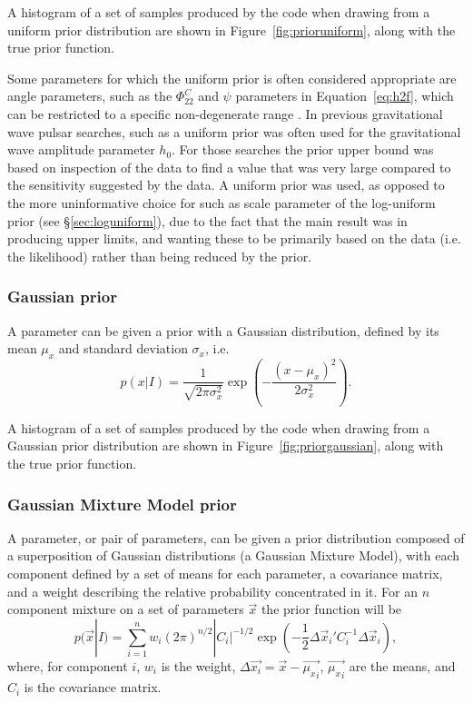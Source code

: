 A histogram of a set of samples produced by the code when drawing from a uniform prior distribution are shown in Figure~\ref{fig:prioruniform},
along with the true prior function.

Some parameters for which the uniform prior is often considered appropriate are angle parameters, such as the $\Phi_{22}^C$ and $\psi$
parameters in Equation~\ref{eq:h2f}, which can be restricted to a specific non-degenerate range \citep[see, e.g., Table~1 in][]{2015MNRAS.453.4399P}. 
In previous gravitational wave pulsar searches, such as \citet{2010ApJ...713..671A,2014ApJ...785..119A} a uniform prior was often used for
the gravitational wave amplitude parameter $h_0$. For those searches the prior upper bound was based on inspection of the data to find a
value that was very large compared to the sensitivity suggested by the data. A uniform prior was used, as opposed to the more
uninformative choice for such as scale parameter of the log-uniform prior (see \S\ref{sec:loguniform}), due to the fact that the main
result was in producing upper limits, and wanting these to be primarily based on the data (i.e. the likelihood) rather than being reduced
by the prior.

\subsubsection{Gaussian prior}

A parameter can be given a prior with a Gaussian distribution, defined by its mean $\mu_x$ and standard deviation $\sigma_x$, i.e.
\begin{equation}
 p(x|I) = \frac{1}{\sqrt{2\pi\sigma_x^2}}\exp{\left(-\frac{(x-\mu_x)^2}{2\sigma_x^2}\right)}.
\end{equation}

A histogram of a set of samples produced by the code when drawing from a Gaussian prior distribution are shown in Figure~\ref{fig:priorgaussian},
along with the true prior function.

\subsubsection{Gaussian Mixture Model prior}

A parameter, or pair of parameters, can be given a prior distribution composed of a superposition of Gaussian distributions (a
Gaussian Mixture Model), with each component defined by a set of means for each parameter, a covariance matrix, and a weight
describing the relative probability concentrated in it. For an $n$ component mixture on a set of parameters $\vec{x}$ the prior
function will be
\begin{equation}
 p(\vec{x}|I) = \sum_{i=1}^n w_i(2\pi)^{n/2}|C_i|^{-1/2}\exp{\left(-\frac{1}{2}{\Delta\vec{x}_i}'C_i^{-1}\Delta\vec{x}_i\right)},
\end{equation}
where, for component $i$, $w_i$ is the weight, $\Delta\vec{x_i}= \vec{x}-\vec{{\mu_x}_i}$, $\vec{{\mu_x}_i}$ are the means, and
$C_i$ is the covariance matrix.

